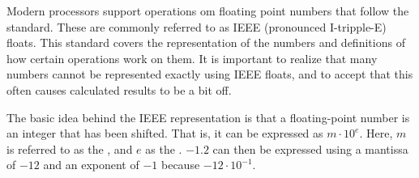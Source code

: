 Modern processors support operations om floating point numbers that follow the  standard. These are commonly referred to as IEEE (pronounced I-tripple-E) floats. This standard covers the representation of the numbers and definitions of how certain operations work on them. It is important to realize that many numbers cannot be represented exactly using IEEE floats, and to accept that this often causes calculated results to be a bit off.

The basic idea behind the IEEE representation is that a floating-point number is an integer that has been shifted. That is, it can be expressed as $m \cdot 10^e$. Here, $m$ is referred to as the , and $e$ as the . $-1.2$ can then be expressed using a mantissa of $-12$ and an exponent of $-1$ because $-12 \cdot 10^{-1}$.



